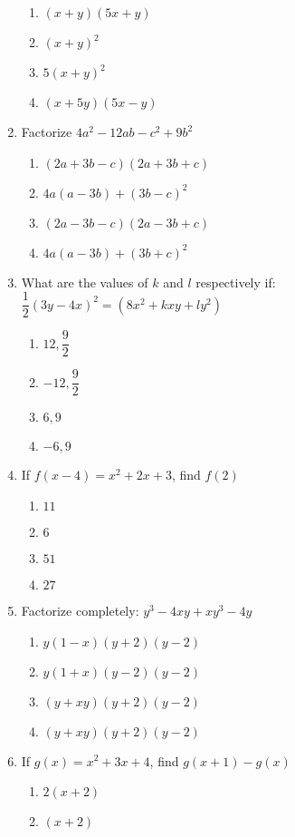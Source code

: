 \begin{multicols}{2}
\begin{enumerate}[label={\arabic*.}]
	\begin{enumerate}[label={\Alph*.}]
	\item \((x+y)(5x+y)\)
	\item \((x+y)^2\)
	\item \(5(x+y)^2\)
	\item \((x+5y)(5x-y)\)
	\end{enumerate}
\item Factorize \(4a^2-12ab-c^2+9b^2\)
	\begin{enumerate}[label={\Alph*.}]
	\item \((2a+3b-c)(2a+3b+c)\)
	\item \(4a(a-3b)+(3b-c)^2\)
	\item \((2a-3b-c)(2a-3b+c)\)
	\item \(4a(a-3b) + (3b+c)^2\)
	\end{enumerate}
\item What are the values of \(k\) and \(l\) respectively if: \(\dfrac{1}{2}(3y-4x)^2 = (8{x}^{2}+kxy+ly^2)\) 
	\begin{enumerate}[label={\Alph*.}]
	\item \(12, \dfrac{9}{2}\)
	\item \(-12, \dfrac{9}{2}\)
	\item \(6, 9\)
	\item \(-6, 9\)
	\end{enumerate}
\item If \(f(x-4) = {x}^{2}+2x+3\), find \(f(2)\)
	\begin{enumerate}[label={\Alph*.}]
	\item \(11\)
	\item \(6\)
	\item \(51\)
	\item \(27\)
	\end{enumerate}
\item Factorize completely: \(y^3-4xy+xy^3-4y\)
	\begin{enumerate}[label={\Alph*.}]
	\item \(y(1-x)(y+2)(y-2)\)
	\item \(y(1+x)(y-2)(y-2)\)
	\item \((y+xy)(y+2)(y-2)\)
	\item \((y+xy)(y+2)(y-2)\)
	\end{enumerate}
\item If \(g(x) = {x}^{2}+3x+4\), find \(g(x+1) - g(x)\)
	\begin{enumerate}[label={\Alph*.}]
	\item \(2(x+2)\)
	\item \((x+2)\)

\end{enumerate}
\end{enumerate}
\end{multicols}
